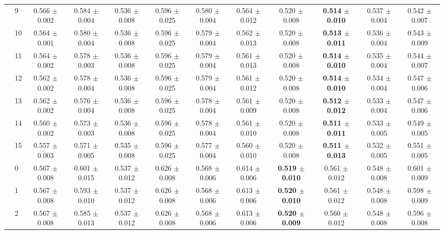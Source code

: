 \begin{table*}[t]
{\begin{tabular}{%
  ll
  @{\quad}
  c@{\hskip 4pt}c
  @{\quad\quad}
  c@{\hskip 4pt}c
  @{\quad\quad}
  c@{\hskip 4pt}c
  @{\quad\quad}
  c@{\hskip 4pt}c
  @{\quad\quad}
  c@{\hskip 4pt}c
}
        & 9 & 0.566 $\pm$ 0.002 & 0.584 $\pm$ 0.004 & 0.536 $\pm$ 0.008 & 0.596 $\pm$ 0.025 & 0.580 $\pm$ 0.004 & 0.564 $\pm$ 0.012 & 0.520 $\pm$ 0.008 & \textbf{0.514 $\pm$ 0.010} & 0.537 $\pm$ 0.004 & 0.542 $\pm$ 0.007 \\
        & 10 & 0.564 $\pm$ 0.001 & 0.580 $\pm$ 0.004 & 0.536 $\pm$ 0.008 & 0.596 $\pm$ 0.025 & 0.579 $\pm$ 0.004 & 0.562 $\pm$ 0.013 & 0.520 $\pm$ 0.008 & \textbf{0.513 $\pm$ 0.011} & 0.536 $\pm$ 0.004 & 0.543 $\pm$ 0.009 \\
        & 11 & 0.564 $\pm$ 0.002 & 0.578 $\pm$ 0.003 & 0.536 $\pm$ 0.008 & 0.596 $\pm$ 0.025 & 0.579 $\pm$ 0.004 & 0.561 $\pm$ 0.013 & 0.520 $\pm$ 0.008 & \textbf{0.514 $\pm$ 0.010} & 0.535 $\pm$ 0.004 & 0.544 $\pm$ 0.007 \\
        & 12 & 0.562 $\pm$ 0.002 & 0.578 $\pm$ 0.004 & 0.536 $\pm$ 0.008 & 0.596 $\pm$ 0.025 & 0.579 $\pm$ 0.004 & 0.561 $\pm$ 0.012 & 0.520 $\pm$ 0.008 & \textbf{0.514 $\pm$ 0.010} & 0.534 $\pm$ 0.004 & 0.547 $\pm$ 0.006 \\
        & 13 & 0.562 $\pm$ 0.002 & 0.576 $\pm$ 0.004 & 0.536 $\pm$ 0.008 & 0.596 $\pm$ 0.025 & 0.578 $\pm$ 0.004 & 0.561 $\pm$ 0.009 & 0.520 $\pm$ 0.008 & \textbf{0.512 $\pm$ 0.012} & 0.533 $\pm$ 0.004 & 0.547 $\pm$ 0.006 \\
        & 14 & 0.560 $\pm$ 0.002 & 0.573 $\pm$ 0.003 & 0.536 $\pm$ 0.008 & 0.596 $\pm$ 0.025 & 0.578 $\pm$ 0.004 & 0.561 $\pm$ 0.010 & 0.520 $\pm$ 0.008 & \textbf{0.511 $\pm$ 0.011} & 0.533 $\pm$ 0.005 & 0.549 $\pm$ 0.005 \\
        & 15 & 0.557 $\pm$ 0.003 & 0.571 $\pm$ 0.005 & 0.535 $\pm$ 0.008 & 0.596 $\pm$ 0.025 & 0.577 $\pm$ 0.004 & 0.560 $\pm$ 0.010 & 0.520 $\pm$ 0.008 & \textbf{0.511 $\pm$ 0.013} & 0.532 $\pm$ 0.005 & 0.551 $\pm$ 0.005 \\
\midrule
\assist{} & 0 & 0.567 $\pm$ 0.008 & 0.601 $\pm$ 0.015 & 0.537 $\pm$ 0.012 & 0.626 $\pm$ 0.008 & 0.568 $\pm$ 0.006 & 0.614 $\pm$ 0.006 & \textbf{0.519 $\pm$ 0.010} & 0.561 $\pm$ 0.012 & 0.548 $\pm$ 0.008 & 0.601 $\pm$ 0.009 \\
        & 1 & 0.567 $\pm$ 0.008 & 0.593 $\pm$ 0.010 & 0.537 $\pm$ 0.012 & 0.626 $\pm$ 0.008 & 0.568 $\pm$ 0.006 & 0.613 $\pm$ 0.006 & \textbf{0.520 $\pm$ 0.010} & 0.561 $\pm$ 0.012 & 0.548 $\pm$ 0.008 & 0.598 $\pm$ 0.009 \\
        & 2 & 0.567 $\pm$ 0.008 & 0.585 $\pm$ 0.013 & 0.537 $\pm$ 0.012 & 0.626 $\pm$ 0.008 & 0.568 $\pm$ 0.006 & 0.613 $\pm$ 0.006 & \textbf{0.520 $\pm$ 0.009} & 0.560 $\pm$ 0.012 & 0.548 $\pm$ 0.008 & 0.596 $\pm$ 0.008 \\

\end{tabular}}
\end{table*}
